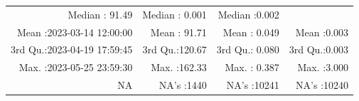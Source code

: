\documentclass[
  10pt,
  a4paper,oneside]{article}
\begin{document}
\begin{longtable}[]{@{}rrrr@{}}
\begin{minipage}[t]{0.19\columnwidth}
Median : 91.49\strut
\end{minipage} & \begin{minipage}[t]{0.19\columnwidth}\raggedleft
Median : 0.001\strut
\end{minipage} & \begin{minipage}[t]{0.19\columnwidth}\raggedleft
Median :0.002\strut
\end{minipage}\tabularnewline
\begin{minipage}[t]{0.33\columnwidth}\raggedleft
Mean :2023-03-14 12:00:00\strut
\end{minipage} & \begin{minipage}[t]{0.19\columnwidth}\raggedleft
Mean : 91.71\strut
\end{minipage} & \begin{minipage}[t]{0.19\columnwidth}\raggedleft
Mean : 0.049\strut
\end{minipage} & \begin{minipage}[t]{0.19\columnwidth}\raggedleft
Mean :0.003\strut
\end{minipage}\tabularnewline
\begin{minipage}[t]{0.33\columnwidth}\raggedleft
3rd Qu.:2023-04-19 17:59:45\strut
\end{minipage} & \begin{minipage}[t]{0.19\columnwidth}\raggedleft
3rd Qu.:120.67\strut
\end{minipage} & \begin{minipage}[t]{0.19\columnwidth}\raggedleft
3rd Qu.: 0.080\strut
\end{minipage} & \begin{minipage}[t]{0.19\columnwidth}\raggedleft
3rd Qu.:0.003\strut
\end{minipage}\tabularnewline
\begin{minipage}[t]{0.33\columnwidth}\raggedleft
Max. :2023-05-25 23:59:30\strut
\end{minipage} & \begin{minipage}[t]{0.19\columnwidth}\raggedleft
Max. :162.33\strut
\end{minipage} & \begin{minipage}[t]{0.19\columnwidth}\raggedleft
Max. : 0.387\strut
\end{minipage} & \begin{minipage}[t]{0.19\columnwidth}\raggedleft
Max. :3.000\strut
\end{minipage}\tabularnewline
\begin{minipage}[t]{0.33\columnwidth}\raggedleft
NA\strut
\end{minipage} & \begin{minipage}[t]{0.19\columnwidth}\raggedleft
NA's :1440\strut
\end{minipage} & \begin{minipage}[t]{0.19\columnwidth}\raggedleft
NA's :10241\strut
\end{minipage} & \begin{minipage}[t]{0.19\columnwidth}\raggedleft
NA's :10240\strut
\end{minipage}\tabularnewline
\bottomrule
\end{longtable}
\end{document}
